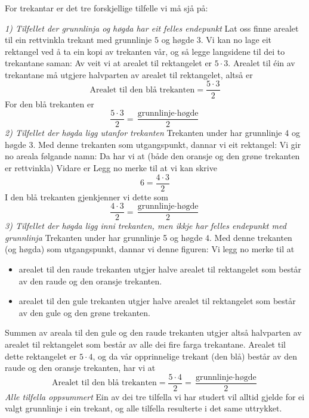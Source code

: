 \subsubsection{\artri \label{artri}}
For trekantar er det tre forskjellige tilfelle vi må sjå på: \vsk

\textit{1) Tilfellet der grunnlinja og høgda har eit felles endepunkt} \os
Lat oss finne arealet til ein rettvinkla trekant med grunnlinje $ 5 $ og høgde $ 3 $.
Vi kan no lage eit rektangel ved å ta ein kopi av trekanten vår, og så legge langsidene til dei to trekantane saman:
Av  veit vi at arealet til rektangelet er $ {5\cdot 3} $. Arealet til éin av trekantane må utgjere halvparten av arealet til rektangelet, altså er
\[ \text{Arealet til den blå trekanten} = \frac{5\cdot 3}{2} \]
For den blå trekanten er 
\[\frac{5\cdot3}{2}= \frac{\text{grunnlinje}\cdot \text{høgde}}{2} \]
\newpage
\textit{2) Tilfellet der høgda ligg utanfor trekanten} \os
Trekanten under har grunnlinje 4 og høgde 3. 
Med denne trekanten som utgangspunkt, dannar vi eit rektangel:
Vi gir no areala følgande namn:
Da har vi at (både den oransje og den grøne trekanten er rettvinkla)
Vidare er
Legg no merke til at vi kan skrive
\[ 6=\frac{4\cdot3}{2} \]
I den blå trekanten gjenkjenner vi dette som 
\[ \frac{4\cdot3}{2}=\frac{\text{grunnlinje}\cdot\text{høgde}}{2} \]
\newpage
\textit{3) Tilfellet der høgda ligg inni trekanten, men ikkje har felles endepunkt med grunnlinja} \os
Trekanten under har grunnlinje 5 og høgde 4.
Med denne trekanten (og høgda) som utgangspunkt, dannar vi denne figuren:
Vi legg no merke til at
\begin{itemize}
	\item arealet til den raude trekanten utgjer halve arealet til rektangelet som består av den raude og den oransje trekanten.
	\item arealet til den gule trekanten utgjer halve arealet til rektangelet som består av den gule og den grøne trekanten.
\end{itemize}
Summen av areala til den gule og den raude trekanten utgjer altså halvparten av arealet til rektangelet som består av alle dei fire farga trekantane. Arealet til dette rektangelet er $ 5\cdot4 $, og da vår opprinnelige trekant (den blå) består av den raude og den oransje trekanten, har vi at
\[ \text{Arealet til den blå trekanten}=\frac{5\cdot4}{2}=\frac{\text{grunnlinje}\cdot\text{høgde}}{2} \] 
\newpage
\textit{Alle tilfella oppsummert}\os
Ein av dei tre tilfella vi har studert vil alltid  gjelde for ei valgt grunnlinje i ein trekant, og alle tilfella resulterte i det same uttrykket.\regv

